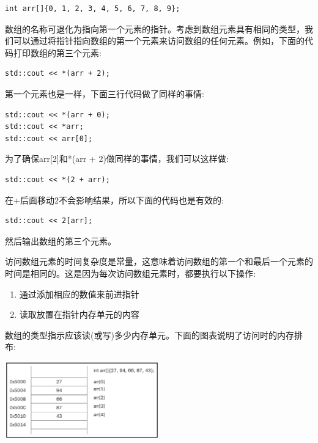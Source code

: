 \begin{lstlisting}[caption={}]
int arr[]{0, 1, 2, 3, 4, 5, 6, 7, 8, 9};
\end{lstlisting}

数组的名称可退化为指向第一个元素的指针。考虑到数组元素具有相同的类型，我们可以通过将指针指向数组的第一个元素来访问数组的任何元素。例如，下面的代码打印数组的第三个元素: \par

\begin{lstlisting}[caption={}]
std::cout << *(arr + 2);
\end{lstlisting}

第一个元素也是一样，下面三行代码做了同样的事情: \par

\begin{lstlisting}[caption={}]
std::cout << *(arr + 0);
std::cout << *arr;
std::cout << arr[0];
\end{lstlisting}

为了确保arr[2]和*(arr + 2)做同样的事情，我们可以这样做:\par

\begin{lstlisting}[caption={}]
std::cout << *(2 + arr);
\end{lstlisting}

在+后面移动2不会影响结果，所以下面的代码也是有效的:\par

\begin{lstlisting}[caption={}]
std::cout << 2[arr];
\end{lstlisting}

然后输出数组的第三个元素。 \par

访问数组元素的时间复杂度是常量，这意味着访问数组的第一个和最后一个元素的时间是相同的。这是因为每次访问数组元素时，都要执行以下操作: \par

\begin{enumerate}
	\item 通过添加相应的数值来前进指针
	\item 读取放置在指针内存单元的内容 
\end{enumerate}

数组的类型指示应该读(或写)多少内存单元。下面的图表说明了访问时的内存排布: \par

\begin{center}
	\includegraphics[width=0.5\textwidth]{content/Section-1/Chapter-2/14}
\end{center}

